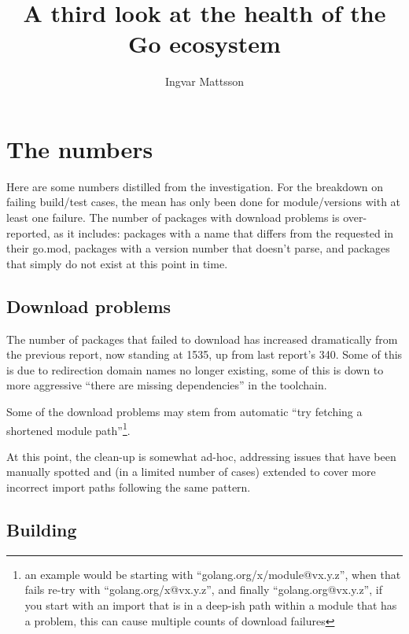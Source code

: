 \documentclass[a4paper]{paper}
\begin{document}
\title{A third look at the health of the Go ecosystem}
\author{Ingvar Mattsson}

\maketitle







\section{The numbers}

Here are some numbers distilled from the investigation. For the
breakdown on failing build/test cases, the mean has only been done for
module/versions with at least one failure. The number of packages with
download problems is over-reported, as it includes: packages with a
name that differs from the requested in their go.mod, packages with a
version number that doesn't parse, and packages that simply do not
exist at this point in time.



\subsection{Download problems}

The number of packages that failed to download has increased
dramatically from the previous report, now standing at 1535, up from
last report's 340. Some of this is due to redirection domain names no
longer existing, some of this is down to more aggressive ``there are
missing dependencies'' in the toolchain.

Some of the download problems may stem from automatic ``try fetching a
shortened module path''\footnote{an example would be starting with
  ``golang.org/x/module@vx.y.z'', when that fails re-try with
  ``golang.org/x@vx.y.z'', and finally ``golang.org@vx.y.z'', if you
  start with an import that is in a deep-ish path within a module that
  has a problem, this can cause multiple counts of download failures}.

At this point, the clean-up is somewhat ad-hoc, addressing issues that
have been manually spotted and (in a limited number of cases) extended
to cover more incorrect import paths following the same pattern.

\subsection{Building}
\end{document}
